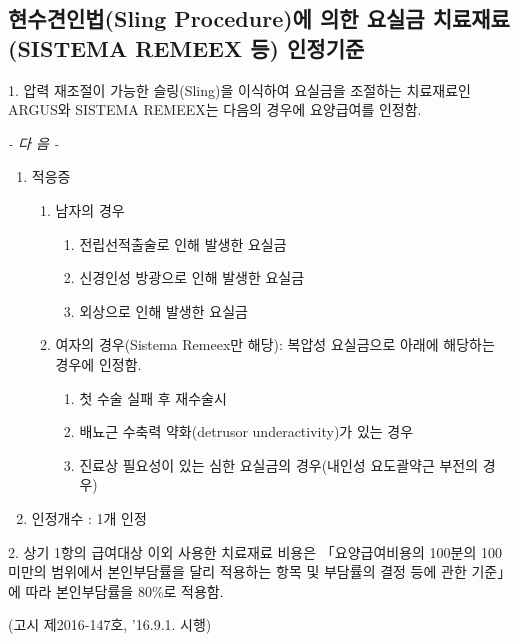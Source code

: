 
 \par
{}



\subsection{현수견인법(Sling Procedure)에 의한 요실금 치료재료(SISTEMA REMEEX 등) 인정기준}
1. 압력 재조절이 가능한 슬링(Sling)을 이식하여 요실금을 조절하는 치료재료인 ARGUS와 SISTEMA REMEEX는 다음의 경우에  요양급여를 인정함. \par
\begin{center}\emph{- 다    음 -}\end{center}
\begin{enumerate}[가.]\tightlist
\item 적응증
	\begin{enumerate}[(1)]\tightlist
	\item  남자의 경우
		\begin{enumerate}[(가)]\tightlist
		\item 전립선적출술로 인해 발생한 요실금
		\item 신경인성 방광으로 인해 발생한 요실금
		\item 외상으로 인해 발생한 요실금
		\end{enumerate}		
	\item 여자의 경우(Sistema Remeex만 해당): 복압성 요실금으로 아래에 해당하는 경우에 인정함.
		\begin{enumerate}[(가)]\tightlist
		\item 첫 수술 실패 후 재수술시
		\item 배뇨근 수축력 약화(detrusor underactivity)가  있는 경우
		\item 진료상 필요성이 있는 심한 요실금의 경우(내인성 요도괄약근 부전의 경우)
		\end{enumerate}
	\end{enumerate}
\item 인정개수 : 1개 인정
\end{enumerate}
2. 상기 1항의 급여대상 이외 사용한 치료재료 비용은 「요양급여비용의 100분의 100 미만의 범위에서 본인부담률을 달리 적용하는 항목 및 부담률의 결정 등에 관한 기준」에 따라 본인부담률을 80\%로 적용함.\par
(고시 제2016-147호, '16.9.1. 시행)\par

